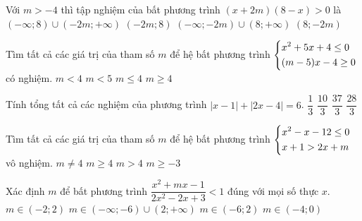 \begin{ex}%
Với $m>-4$ thì tập nghiệm của bất phương trình $(x+2m)(8-x)>0$ là 	
	\choice
	{$(-\infty;8)\cup (-2m;+\infty)$}
	{\True $(-2m;8)$}
	{$(-\infty;-2m)\cup (8;+\infty)$}
	{$(8;-2m)$}
\end{ex}
\begin{ex}%
Tìm tất cả các giá trị của tham số $m$ để hệ bất phương trình $\left\{\begin{aligned}&x^2+5x+4\le 0\\ &(m-5)x-4\ge 0\end{aligned}\right.$ có nghiệm.	
	\choice
	{$m<4$}
	{$m<5$}
	{\True $m\le 4$}
	{$m\ge 4$}
\end{ex}
\begin{ex}%
Tính tổng tất cả các nghiệm của phương trình $|x-1|+|2x-4|=6$.	
	\choice
	{$\dfrac{1}{3}$}
	{\True $\dfrac{10}{3}$}
	{$\dfrac{37}{3}$}
	{$\dfrac{28}{3}$}
\end{ex}
\begin{ex}%
Tìm tất cả các giá trị của tham số $m$ để hệ bất phương trình $\left\{\begin{aligned}&x^2-x-12\le 0\\ &x+1>2x+m\end{aligned}\right.$	vô nghiệm.
	\choice
	{$m\neq 4$}
	{\True $m\ge 4$}
	{$m>4$}
	{$m\ge -3$}
\end{ex}
\begin{ex}%
Xác định $m$ để bất phương trình $\dfrac{x^2+mx-1}{2x^2-2x+3}<1$   đúng với mọi số thực $x$.	
	\choice
	{$m\in (-2;2)$}
	{$m\in (-\infty;-6)\cup (2;+\infty)$}
	{\True $m\in (-6;2)$}
	{$m\in (-4;0)$}
\end{ex}
